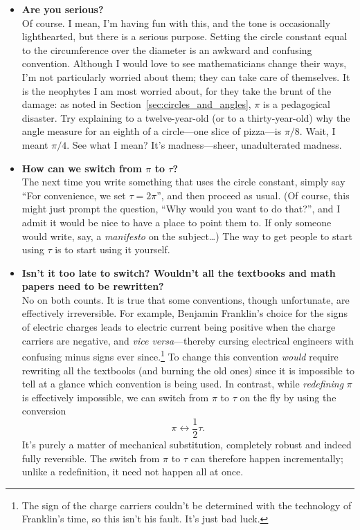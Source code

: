 \begin{itemize}

  \item \textbf{Are you serious?} \\ Of course. I mean, I'm having fun with this, and the tone is occasionally lighthearted, but there is a serious purpose. Setting the circle constant equal to the circumference over the diameter is an awkward and confusing convention. Although I would love to see mathematicians change their ways, I'm not particularly worried about them; they can take care of themselves. It is the neophytes I am most worried about, for they take the brunt of the damage: as noted in Section~\ref{sec:circles_and_angles}, $\pi$ is a pedagogical disaster. Try explaining to a twelve-year-old (or to a thirty-year-old) why the angle measure for an eighth of a circle---one slice of pizza---is $\pi/8$. Wait, I meant $\pi/4$. See what I mean? It's madness---sheer, unadulterated madness.

  \item \textbf{How can we switch from $\pi$ to $\tau$?} \\ The next time you write something that uses the circle constant, simply say ``For convenience, we set $\tau = 2\pi$'', and then proceed as usual. (Of course, this might just prompt the question, ``Why would you want to do that?'', and I admit it would be nice to have a place to point them to. If only someone would write, say, a \emph{manifesto} on the subject\ldots) The way to get people to start using $\tau$ is to start using it yourself.

  \item \textbf{Isn't it too late to switch? Wouldn't all the textbooks and math papers need to be rewritten?} \\ No on both counts. It is true that some conventions, though unfortunate, are effectively irreversible. For example, Benjamin Franklin's choice for the signs of electric charges leads to electric current being positive when the charge carriers are negative, and \emph{vice versa}---thereby cursing electrical engineers with confusing minus signs ever since.\footnote{The sign of the charge carriers couldn't be determined with the technology of Franklin's time, so this isn't his fault. It's just bad luck.} To change this convention \emph{would} require rewriting all the textbooks (and burning the old ones) since it is impossible to tell at a glance which convention is being used. In contrast, while \emph{redefining} $\pi$ is effectively impossible, we can switch from $\pi$ to $\tau$ on the fly by using the conversion \[ \pi \leftrightarrow \textstyle{\frac{1}{2}}\tau. \] It's purely a matter of mechanical substitution, completely robust and indeed fully reversible. The switch from $\pi$ to $\tau$ can therefore happen incrementally; unlike a redefinition, it need not happen all at once.


\end{itemize}
